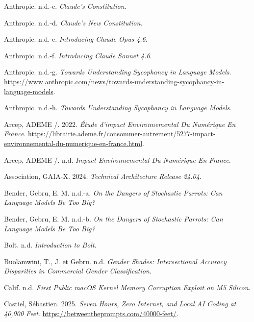\documentclass[
  10pt,
  a4paper,
  DIV=11,
  numbers=noendperiod,
  oneside]{scrreprt}
\newlength{\cslhangindent}
\newenvironment{CSLReferences}[2] %
 {\begin{list}{}{%
  \setlength{\itemindent}{0pt}
  \setlength{\leftmargin}{0pt}
  \setlength{\parsep}{0pt}
  \ifodd #1
   \setlength{\leftmargin}{\cslhangindent}
   \setlength{\itemindent}{-1\cslhangindent}
  \fi
  \setlength{\itemsep}{#2\baselineskip}}}
 {\end{list}}
\let\oldemph\emph
\renewcommand{\emph}[1]{\oldemph{\textcolor{cmmgray}{#1}}}
\begin{document}
\begin{CSLReferences}{1}{1}
Anthropic. n.d.-c. \emph{Claude's Constitution}.

Anthropic. n.d.-d. \emph{Claude's New Constitution}.

Anthropic. n.d.-e. \emph{Introducing Claude Opus 4.6}.

Anthropic. n.d.-f. \emph{Introducing Claude Sonnet 4.6}.

Anthropic. n.d.-g. \emph{Towards Understanding Sycophancy in Language
Models}.
\url{https://www.anthropic.com/news/towards-understanding-sycophancy-in-language-models}.

Anthropic. n.d.-h. \emph{Towards Understanding Sycophancy in Language
Models}.

Arcep, ADEME /. 2022. \emph{Étude d'impact Environnemental Du Numérique
En France}.
\url{https://librairie.ademe.fr/consommer-autrement/5277-impact-environnemental-du-numerique-en-france.html}.

Arcep, ADEME /. n.d. \emph{Impact Environnemental Du Numérique En
France}.

Association, GAIA-X. 2024. \emph{Technical Architecture Release 24.04}.

Bender, Gebru, E. M. n.d.-a. \emph{On the Dangers of Stochastic Parrots:
Can Language Models Be Too Big?}

Bender, Gebru, E. M. n.d.-b. \emph{On the Dangers of Stochastic Parrots:
Can Language Models Be Too Big?}

Bolt. n.d. \emph{Introduction to Bolt}.

Buolamwini, T., J. et Gebru. n.d. \emph{Gender Shades: Intersectional
Accuracy Disparities in Commercial Gender Classification}.

Calif. n.d. \emph{First Public macOS Kernel Memory Corruption Exploit on
M5 Silicon}.

Castiel, Sébastien. 2025. \emph{Seven Hours, Zero Internet, and Local AI
Coding at 40,000 Feet}. \url{https://betweentheprompts.com/40000-feet/}.


\end{CSLReferences}
\end{document}
